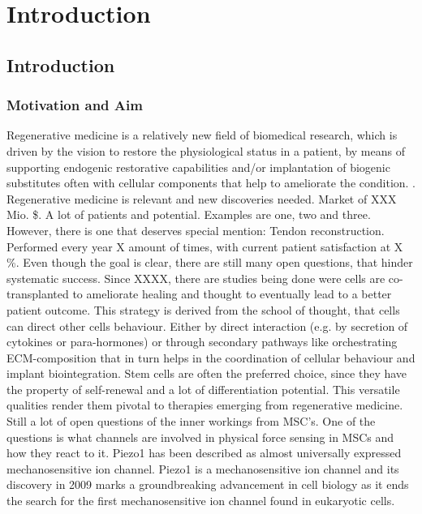 \newcommand{\package}{\emph}


\chapter{Introduction}

\section{Introduction}
\subsection{Motivation and Aim}
\label{sec:motivation}
Regenerative medicine is a relatively new field of biomedical research, which is driven by the vision to restore the physiological status in a patient, by means of supporting endogenic restorative capabilities and/or implantation of biogenic substitutes often with cellular components that help to ameliorate the condition. . Regenerative medicine is relevant and new discoveries needed. Market of XXX Mio. \$. A lot of patients and potential. Examples are one, two and three. However, there is one that deserves special mention: Tendon reconstruction. Performed every year X amount of times, with current patient satisfaction at X \%. Even though the goal is clear, there are still many open questions, that hinder systematic success. Since XXXX, there are studies being done were cells are co-transplanted to ameliorate healing and thought to eventually lead to a better patient outcome. This strategy is derived from the school of thought, that cells can direct other cells behaviour. Either by direct interaction (e.g. by secretion of cytokines or para-hormones) or through secondary pathways like orchestrating ECM-composition that in turn helps in the coordination of cellular behaviour and implant biointegration. Stem cells are often the preferred choice, since they have the property of self-renewal and a lot of differentiation potential. 
  This versatile qualities render them pivotal to therapies emerging from regenerative medicine. Still a lot of open questions of the inner workings from MSC's. One of the questions is what channels are involved in physical force sensing in MSCs and how they react to it. 
Piezo1 has been described as almost universally expressed mechanosensitive ion channel.  Piezo1 is a mechanosensitive ion channel and its discovery in 2009 marks a groundbreaking advancement in cell biology as it ends the search for the first mechanosensitive ion channel found in eukaryotic cells. 

